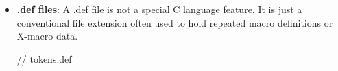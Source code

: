 \documentclass{report}
\begin{document}
\begin{itemize}
\begin{cppcode}
                    static const int operator_precedence[] = {
                        OPERATOR_LIST(X)
                    };

                    #undef X
                \end{cppcode}
                \bigbreak \noindent 
                Now adding exponentiation requires changing exactly one place:
                \bigbreak \noindent 
                \begin{cppcode}
                    #define OPERATOR_LIST(X)             \
                    X(ADD, "+", 10)                      \
                    X(SUB, "-", 10)                      \
                    X(MUL, "*", 20)                      \
                    X(DIV, "/", 20)                      \
                    X(POW, "^", 30)
                \end{cppcode}
                \bigbreak \noindent 
                The enum, spelling table, and precedence table all update automatically. That is the main reason X-macros are valuable: they eliminate parallel maintenance.
            \item \textbf{.def files}: A .def file is not a special C language feature. It is just a conventional file extension often used to hold repeated macro definitions or X-macro data.
                \bigbreak \noindent 
                \begin{cppcode}
                // tokens.def


\end{cppcode}
\end{itemize}
\end{document}
